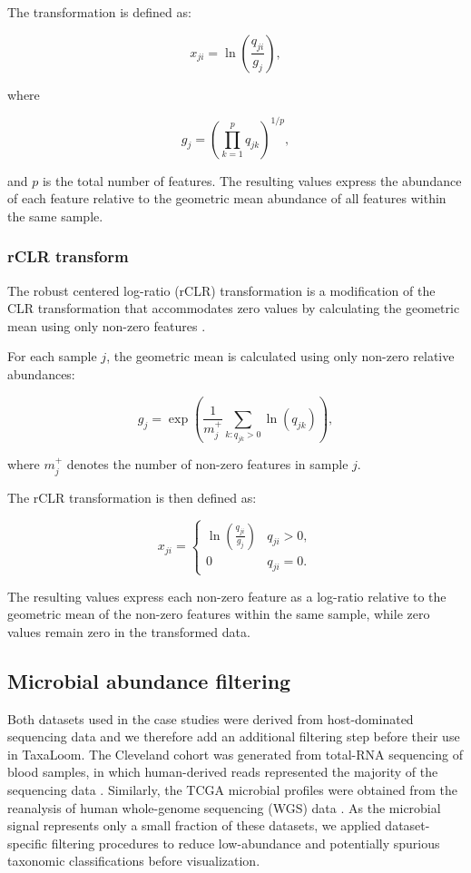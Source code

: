\begin{bibunit}[apalike]
\begin{appendices}
The transformation is defined as:

\[
x_{ji} = \ln\left(\frac{q_{ji}}{g_j}\right),
\]

where

\[
g_j = \left(\prod_{k=1}^{p} q_{jk}\right)^{1/p},
\]

and $p$ is the total number of features. The resulting values express the abundance of each feature relative to the geometric mean abundance of all features within the same sample.

\subsubsection*{rCLR transform}

The robust centered log-ratio (rCLR) transformation is a modification of the CLR transformation that accommodates zero values by calculating the geometric mean using only non-zero features \citep{martino_novel_2019}.

For each sample $j$, the geometric mean is calculated using only non-zero relative abundances:

\[
g_j=\exp\left(\frac{1}{m_j^{+}}\sum_{k:q_{jk}>0}\ln(q_{jk})\right),
\]

where $m_j^{+}$ denotes the number of non-zero features in sample $j$.

The rCLR transformation is then defined as:

\[
x_{ji}=
\begin{cases}
\ln\left(\frac{q_{ji}}{g_j}\right) & q_{ji}>0,\\
0 & q_{ji}=0.
\end{cases}
\]

The resulting values express each non-zero feature as a log-ratio relative to the geometric mean of the non-zero features within the same sample, while zero values remain zero in the transformed data.


\subsection{Microbial abundance filtering}\label{secA2}

Both datasets used in the case studies were derived from host-dominated sequencing data and we therefore add an additional filtering step before their use in TaxaLoom. The Cleveland cohort was generated from total-RNA sequencing of blood samples, in which human-derived reads represented the majority of the sequencing data \cite{nganou-makamdop_translocated_2021,colajanni_benchmarking_2026}. Similarly, the TCGA microbial profiles were obtained from the reanalysis of human whole-genome sequencing (WGS) data \citep{ge_comprehensive_2025}. As the microbial signal represents only a small fraction of these datasets, we applied dataset-specific filtering procedures to reduce low-abundance and potentially spurious taxonomic classifications before visualization. 


\end{appendices}
\end{bibunit}

